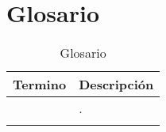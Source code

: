 \newpage
\section{Glosario}


\begin{longtable}{|p{5cm}|p{11cm}|}%
		\hline
			\textbf{Termino} & \textbf{Descripción}\\ %
		\hline\hline %
			{} & {.}\\		
		\hline
\caption{Glosario}
\end{longtable}
